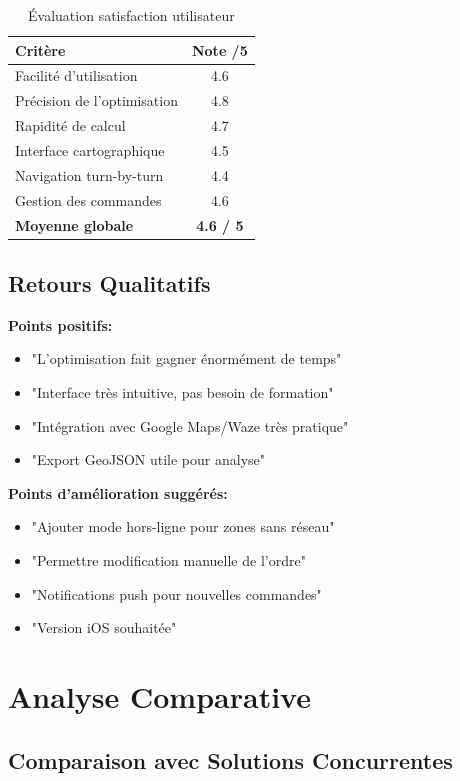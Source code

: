 \documentclass[12pt,a4paper]{report}
\begin{document}
\begin{table}[H]
\centering
\begin{tabular}{|l|c|}
\hline
\textbf{Critère} & \textbf{Note /5} \\
\hline
Facilité d'utilisation & 4.6 \\
Précision de l'optimisation & 4.8 \\
Rapidité de calcul & 4.7 \\
Interface cartographique & 4.5 \\
Navigation turn-by-turn & 4.4 \\
Gestion des commandes & 4.6 \\
\hline
\textbf{Moyenne globale} & \textbf{4.6 / 5} \\
\hline
\end{tabular}
\caption{Évaluation satisfaction utilisateur}
\end{table}

\subsection{Retours Qualitatifs}

\textbf{Points positifs:}
\begin{itemize}
    \item "L'optimisation fait gagner énormément de temps"
    \item "Interface très intuitive, pas besoin de formation"
    \item "Intégration avec Google Maps/Waze très pratique"
    \item "Export GeoJSON utile pour analyse"
\end{itemize}

\textbf{Points d'amélioration suggérés:}
\begin{itemize}
    \item "Ajouter mode hors-ligne pour zones sans réseau"
    \item "Permettre modification manuelle de l'ordre"
    \item "Notifications push pour nouvelles commandes"
    \item "Version iOS souhaitée"
\end{itemize}

\section{Analyse Comparative}

\subsection{Comparaison avec Solutions Concurrentes}
\end{document}
